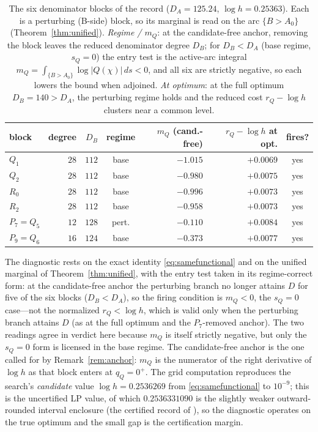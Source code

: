 \documentclass[11pt,reqno]{amsart}
\theoremstyle{plain}
\theoremstyle{definition}
\theoremstyle{remark}
\newcommand{\rQ}{r_Q}
\newcommand{\dA}{D_A}
\newcommand{\dB}{D_B}
\begin{document}
\begin{table}[ht]
\centering\small
\renewcommand{\arraystretch}{1.2}
\begin{tabular}{@{}lrrcrrc@{}}
\toprule
block & degree & $\dB$ & regime & $m_Q$ (cand.-free) & $\rQ-\log h$ at opt. & fires?\\
\midrule
$Q_1$ & $28$ & $112$ & base & $-1.015$ & $+0.0069$ & yes\\
$Q_2$ & $28$ & $112$ & base & $-0.980$ & $+0.0075$ & yes\\
$R_0$ & $28$ & $112$ & base & $-0.996$ & $+0.0073$ & yes\\
$R_2$ & $28$ & $112$ & base & $-0.958$ & $+0.0073$ & yes\\
$P_7=Q_5$ & $12$ & $128$ & pert. & $-0.110$ & $+0.0084$ & yes\\
$P_9=Q_6$ & $16$ & $124$ & base & $-0.373$ & $+0.0077$ & yes\\
\bottomrule
\end{tabular}
\medskip
\caption{The six denominator blocks of the \citet{Gri26} record ($\dA=125.24$,
$\log h=0.25363$). Each is a perturbing (B-side) block, so its marginal is read on the
arc $\{B>A_0\}$ (Theorem~\ref{thm:unified}). \emph{Regime / $m_Q$}: at the candidate-free
anchor, removing the block leaves the reduced denominator degree $\dB$; for $\dB<\dA$
(base regime, $s_Q=0$) the entry test is the active-arc integral
$m_Q=\int_{\{B>A_0\}}\log|Q(\chi)|\,ds<0$, and all six are strictly negative, so each
lowers the bound when adjoined. \emph{At optimum}: at the full optimum $\dB=140>\dA$, the
perturbing regime holds and the reduced cost $\rQ-\log h$ clusters near a common level.}
\label{tab:recordfire}
\end{table}

The diagnostic rests on the exact identity \eqref{eq:samefunctional} and on the unified
marginal of Theorem~\ref{thm:unified}, with the entry test taken in its regime-correct
form: at the candidate-free anchor the perturbing branch no longer attains $D$ for five
of the six blocks ($\dB<\dA$), so the firing condition is $m_Q<0$, the $s_Q=0$ case---not
the normalized $\rQ<\log h$, which is valid only when the perturbing branch attains $D$
(as at the full optimum and the $P_7$-removed anchor). The two readings agree in verdict
here because $m_Q$ is itself strictly negative, but only the $s_Q=0$ form is licensed in
the base regime. The candidate-free anchor is the one called for by
Remark~\ref{rem:anchor}: $m_Q$ is the numerator of the right derivative of $\log h$ as
that block enters at $q_Q=0^+$. The grid computation reproduces the search's
\emph{candidate} value $\log h=0.2536269$ from \eqref{eq:samefunctional} to $10^{-9}$;
this is the uncertified LP value, of which $0.2536331090$ is the slightly weaker
outward-rounded interval enclosure (the certified record of \citet{Gri26}), so the
diagnostic operates on the true optimum and the small gap is the certification margin.
\end{document}
